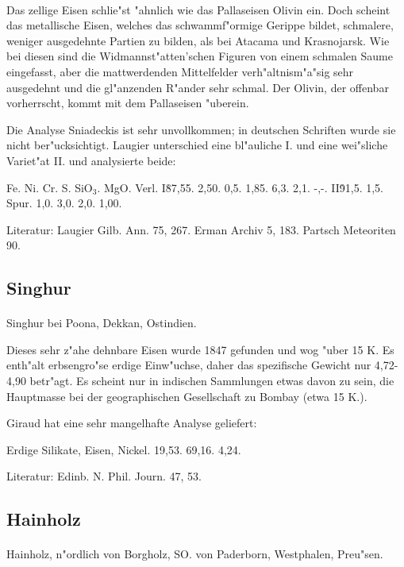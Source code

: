 \documentclass[a4paper, 11pt, oneside]{article}
\begin{document}
\paragraph{}
Das zellige Eisen schlie"st "ahnlich wie das Pallaseisen Olivin ein. Doch scheint das metallische Eisen, welches das schwammf"ormige Gerippe bildet, schmalere, weniger ausgedehnte Partien zu bilden, als bei Atacama und Krasnojarsk. Wie bei diesen sind die Widmannst"atten'schen Figuren von einem schmalen Saume eingefasst, aber die mattwerdenden Mittelfelder verh"altnism"a"sig sehr ausgedehnt und die gl"anzenden R"ander sehr schmal. Der Olivin, der offenbar vorherrscht, kommt mit dem Pallaseisen "uberein.

Die Analyse Sniadeckis ist sehr unvollkommen; in deutschen Schriften wurde sie nicht ber"ucksichtigt. Laugier unterschied eine bl"auliche I. und eine wei"sliche Variet"at II. und analysierte beide:

Fe. Ni. Cr. S. SiO$_{3}$. MgO. Verl.  
I\. 87,55. 2,50. 0,5. 1,85. 6,3. 2,1. -,-.  
II\. 91,5. 1,5. Spur. 1,0. 3,0. 2,0. 1,00.

Literatur: Laugier Gilb. Ann. 75, 267. Erman Archiv 5, 183. Partsch Meteoriten 90.

\subsection{Singhur}
\normalsize
\paragraph{}
Singhur bei Poona, Dekkan, Ostindien.

Dieses sehr z"ahe dehnbare Eisen wurde 1847 gefunden und wog "uber 15 K. Es enth"alt erbsengro"se erdige Einw"uchse, daher das spezifische Gewicht nur 4,72-4,90 betr"agt. Es scheint nur in indischen Sammlungen etwas davon zu sein, die Hauptmasse bei der geographischen Gesellschaft zu Bombay (etwa 15 K.).

Giraud hat eine sehr mangelhafte Analyse geliefert:

Erdige Silikate, Eisen, Nickel.  
19,53. 69,16. 4,24.

Literatur: Edinb. N. Phil. Journ. 47, 53.

\subsection{Hainholz}
\normalsize
\paragraph{}
Hainholz, n"ordlich von Borgholz, SO. von Paderborn, Westphalen, Preu"sen.
\end{document}
